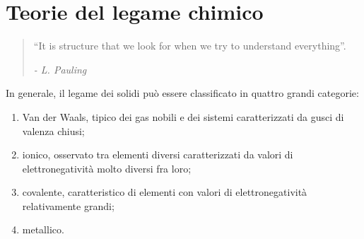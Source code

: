\chapter{Teorie del legame chimico}

\begin{quote}
    ``It is structure that we look for when we try to understand everything''.
    \begin{flushright}
    \textit{- L. Pauling}
    \end{flushright}
\end{quote}
In generale, il legame dei solidi può essere classificato in quattro grandi categorie:
\begin{enumerate}
    \item Van der Waals, tipico dei
    gas nobili e dei sistemi caratterizzati da gusci di valenza chiusi;
    \item ionico, osservato tra elementi diversi caratterizzati da valori di elettronegatività molto diversi fra loro;
    \item covalente, caratteristico di elementi con valori di elettronegatività relativamente grandi;
    \item metallico.
\end{enumerate}
